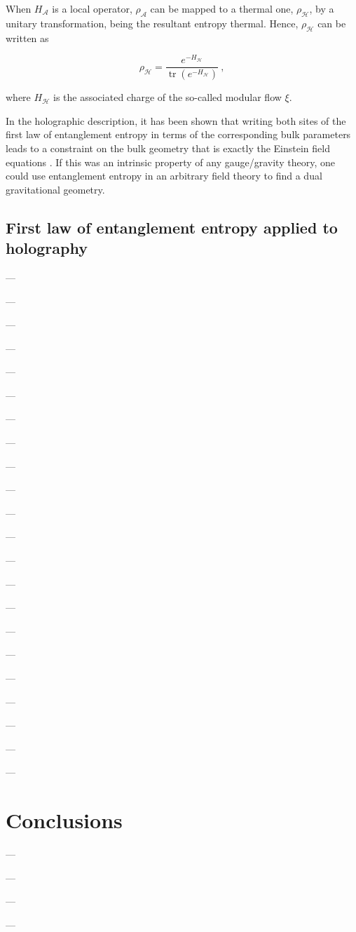 \documentclass[twocolumn]{revtex4}
\providecommand{\eq}[2]{
    \begin{equation}
        #2
    \label{eq:#1}
    \end{equation}
}
\DeclareMathOperator{\calA}{\mathcal{A}}
\DeclareMathOperator{\calH}{\mathcal{H}}
\DeclareMathOperator{\tr}{tr}
\begin{document}
When $H_{\calA}$ is a local operator, $\rho_{\calA}$ can be mapped to a thermal one, $\rho_{\calH}$, by a unitary transformation, being the resultant entropy thermal. Hence, $\rho_{\calH}$ can be written as
\eq{modularH2}{
    \rho_{\calH} = \frac{e^{-H_{\calH}}}{\tr (e^{-H_{\calH}})} \ ,
}
where $H_{\calH}$ is the associated charge of the so-called modular flow $\xi$.

In the holographic description, it has been shown that writing both sites of the first law of entanglement entropy in terms of the corresponding bulk parameters leads to a constraint on the bulk geometry that is exactly the Einstein field equations \cite{fareghbal_first_2019}. If this was an intrinsic property of any gauge/gravity theory, one could use entanglement entropy in an arbitrary field theory to find a dual gravitational geometry.


\subsection{First law of entanglement entropy applied to holography} \label{ss:FLEE_H}

---

---

---

---

---

---

---

---

---

---

---

---

---

---

---

---

---

---

---

---

---

---


\section{Conclusions} \label{s:Conclusions}

---

---

---

---
\end{document}
